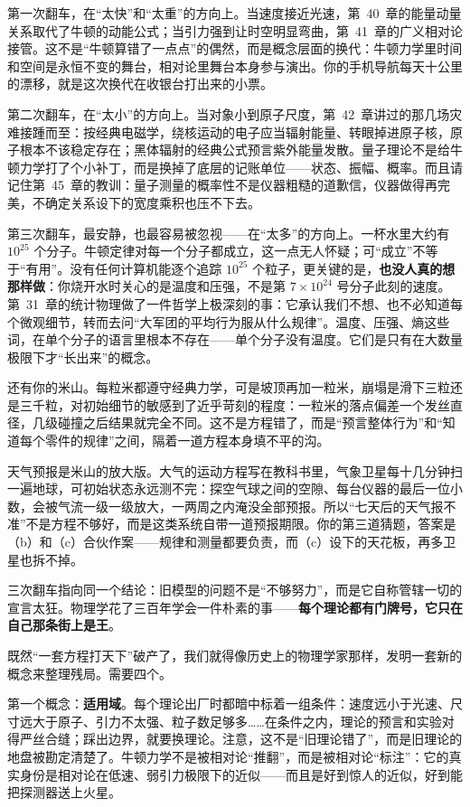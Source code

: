 第一次翻车，在“太快”和“太重”的方向上。当速度接近光速，第~40~章的能量动量关系取代了牛顿的动能公式；当引力强到让时空明显弯曲，第~41~章的广义相对论接管。这不是“牛顿算错了一点点”的偶然，而是概念层面的换代：牛顿力学里时间和空间是永恒不变的舞台，相对论里舞台本身参与演出。你的手机导航每天十公里的漂移，就是这次换代在收银台打出来的小票。

第二次翻车，在“太小”的方向上。当对象小到原子尺度，第~42~章讲过的那几场灾难接踵而至：按经典电磁学，绕核运动的电子应当辐射能量、转眼掉进原子核，原子根本不该稳定存在；黑体辐射的经典公式预言紫外能量发散。量子理论不是给牛顿力学打了个小补丁，而是换掉了底层的记账单位——状态、振幅、概率。而且请记住第~45~章的教训：量子测量的概率性不是仪器粗糙的道歉信，仪器做得再完美，不确定关系设下的宽度乘积也压不下去。

第三次翻车，最安静，也最容易被忽视——在“太多”的方向上。一杯水里大约有 $10^{25}$ 个分子。牛顿定律对每一个分子都成立，这一点无人怀疑；可“成立”不等于“有用”。没有任何计算机能逐个追踪 $10^{25}$ 个粒子，更关键的是，\textbf{也没人真的想那样做}：你烧开水时关心的是温度和压强，不是第 $7\times10^{24}$ 号分子此刻的速度。第~31~章的统计物理做了一件哲学上极深刻的事：它承认我们不想、也不必知道每个微观细节，转而去问“大军团的平均行为服从什么规律”。温度、压强、熵这些词，在单个分子的语言里根本不存在——单个分子没有温度。它们是只有在大数量极限下才“长出来”的概念。

还有你的米山。每粒米都遵守经典力学，可是坡顶再加一粒米，崩塌是滑下三粒还是三千粒，对初始细节的敏感到了近乎苛刻的程度：一粒米的落点偏差一个发丝直径，几级碰撞之后结果就完全不同。这不是方程错了，而是“预言整体行为”和“知道每个零件的规律”之间，隔着一道方程本身填不平的沟。

天气预报是米山的放大版。大气的运动方程写在教科书里，气象卫星每十几分钟扫一遍地球，可初始状态永远测不完：探空气球之间的空隙、每台仪器的最后一位小数，会被气流一级一级放大，一两周之内淹没全部预报。所以“七天后的天气报不准”不是方程不够好，而是这类系统自带一道预报期限。你的第三道猜题，答案是（b）和（c）合伙作案——规律和测量都要负责，而（c）设下的天花板，再多卫星也拆不掉。

三次翻车指向同一个结论：旧模型的问题不是“不够努力”，而是它自称管辖一切的宣言太狂。物理学花了三百年学会一件朴素的事——\textbf{每个理论都有门牌号，它只在自己那条街上是王}。


既然“一套方程打天下”破产了，我们就得像历史上的物理学家那样，发明一套新的概念来整理残局。需要四个。

第一个概念：\textbf{适用域}。每个理论出厂时都暗中标着一组条件：速度远小于光速、尺寸远大于原子、引力不太强、粒子数足够多……在条件之内，理论的预言和实验对得严丝合缝；踩出边界，就要换理论。注意，这不是“旧理论错了”，而是旧理论的地盘被勘定清楚了。牛顿力学不是被相对论“推翻”，而是被相对论“标注”：它的真实身份是相对论在低速、弱引力极限下的近似——而且是好到惊人的近似，好到能把探测器送上火星。

